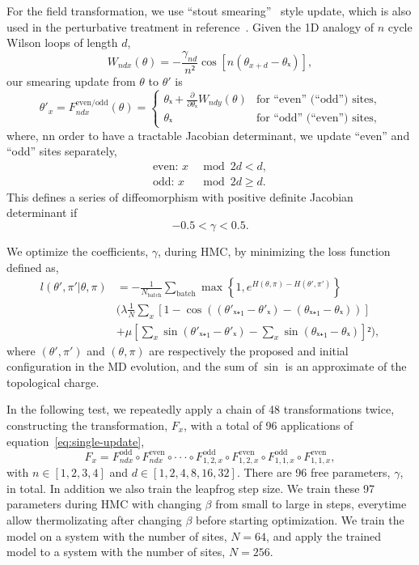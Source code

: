 For the field transformation, we use
``stout smearing''~\cite{Morningstar:2003gk} style update,
which is also used in the perturbative treatment in reference~\cite{Luscher:2009eq}.
Given the 1D analogy of $n$ cycle Wilson loops of length $d$,
\begin{equation}
	W_{ndx}(θ) = -\frac{γ_{nd}}{n²} \cos\left[n(θ_{x+d}-θₓ)\right],
\end{equation}
our smearing update from $θ$ to $θ'$ is
\begin{equation}
	\label{eq:single-update}
	θ'_x = F_{ndx}^{\text{even/odd}}(θ) =
	\begin{cases}
		θₓ + \frac{∂}{∂θₓ}W_{ndy}(θ) &\text{for ``even'' (``odd'') sites}, \\
		θₓ &\text{for ``odd'' (``even'') sites},
	\end{cases}
\end{equation}
where, nn order to have a tractable Jacobian determinant,
we update ``even'' and ``odd'' sites separately,
\begin{align}
	\text{even: } x & \bmod 2d <d, \\
	\text{odd: }  x & \bmod 2d ≥d.
\end{align}
This defines a series of diffeomorphism with positive definite
Jacobian determinant if
\begin{equation}
	-0.5 < γ < 0.5.
\end{equation}

We optimize the coefficients, $γ$, during HMC,
by minimizing the loss function defined as,
\begin{equation}
\label{eq:loss}
\begin{split}
	l(θ',π'|θ,π) &= - \frac{1}{N_{\text{batch}}} \sum_{\text{batch}}
	\max\left\{1, e^{H(θ,π)-H(θ',π')}\right\} \\
	&\Bigg(
		λ \frac{1}{N} \sum_x \left[ 1-\cos\left((θ'ₓ₊₁-θ'ₓ)-(θₓ₊₁-θₓ)\right) \right] \\
		&+ μ \left[ \sum_x \sin(θ'ₓ₊₁-θ'ₓ)-\sum_x \sin(θₓ₊₁-θₓ) \right]²
	\Bigg),
\end{split}
\end{equation}
where $(θ',π')$ and $(θ,π)$ are respectively the proposed and initial configuration
in the MD evolution,
and the sum of $\sin$ is an approximate of the topological charge.

In the following test, we repeatedly apply a chain of 48 transformations twice,
constructing the transformation, $F_x$,
with a total of 96 applications of equation~\eqref{eq:single-update},
\begin{equation}
	F_x =
	F_{ndx}^{\text{odd}} \circ F_{ndx}^{\text{even}} \circ \cdot\cdot\cdot \circ
	F_{1,2,x}^{\text{odd}} \circ F_{1,2,x}^{\text{even}} \circ
	F_{1,1,x}^{\text{odd}} \circ F_{1,1,x}^{\text{even}},
\end{equation}
with $n∈[1,2,3,4]$ and $d∈[1,2,4,8,16,32]$.
There are 96 free parameters, $γ$, in total.
In addition we also train the leapfrog step size.
We train these 97 parameters during HMC with changing $β$
from small to large in steps,
everytime allow thermolizating after changing $β$ before starting optimization.
We train the model on a system with the number of sites, $N=64$,
and apply the trained model to a system with the number of sites, $N=256$.

